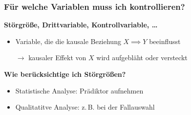 \documentclass{beamer}
\begin{document}
\begin{frame}
\frametitle{Für welche Variablen muss ich kontrollieren?}
\textbf{Störgröße, Drittvariable, Kontrollvariable, \dots}
\begin{itemize}
  \item Variable, die die kausale Beziehung $X \implies Y$ beeinflusst
  \item [$\rightarrow$] kausaler Effekt von $X$ wird aufgebläht oder versteckt
\end{itemize}

\begin{figure}
\begin{subfigure}{.3\textwidth}
  \centering
\end{subfigure}
  \hfill
\begin{subfigure}{.3\textwidth}
  \centering
\end{subfigure}
\hfill
\begin{subfigure}{.3\textwidth}
  \centering
\end{subfigure}
\end{figure}
\textbf{Wie berücksichtige ich Störgrößen?}
\begin{itemize}
  \item Statistische Analyse: Prädiktor aufnehmen
  \item Qualitatitve Analyse: z.\,B. bei der Fallauswahl
\end{itemize}
\end{frame}
\end{document}
